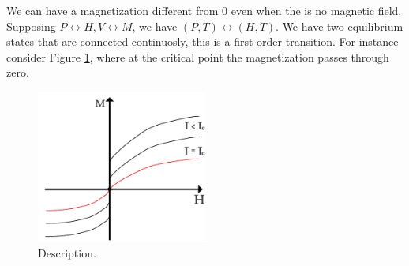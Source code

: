 \documentclass[../main/main.tex]{subfiles}
\begin{document}
We can have a magnetization different from 0 even when the is no magnetic field.
Supposing \( P \leftrightarrow H, V \leftrightarrow M \), we have \( (P,T) \leftrightarrow (H,T) \). We have two equilibrium states that are connected continuosly, this is a first order transition. For instance consider Figure \ref{fig:2_7}, where at  the critical point the magnetization passes through zero.

\begin{figure}[h!]
\centering
\includegraphics[width=0.5\textwidth]{../lessons/2_image/11.pdf}
\caption{\label{fig:2_7} Description.}
\end{figure}
\end{document}
